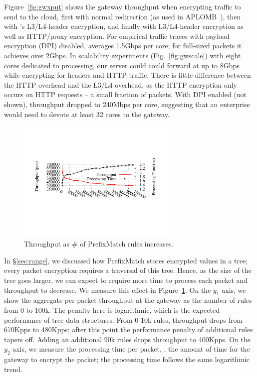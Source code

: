  
Figure~\ref{fig:gwxput} shows the gateway throughput when encrypting traffic to send to the cloud, first with normal redirection (as used in APLOMB~\cite{aplomb}), then with \sys's L3/L4-header encryption, and finally with L3/L4-header encryption as well as HTTP/proxy encryption. 
For empirical traffic traces with payload encryption (DPI) disabled, \sys averages 1.5Gbps per core; for full-sized packets it achieves over 2Gbps.
In scalability experiments (Fig.~\ref{fig:gwscale}) with eight cores dedicated to processing, our server could could forward at up to 8Gbps while encrypting for headers and HTTP traffic.
There is little difference between the HTTP overhead and the L3/L4 overhead, as the HTTP encryption only occurs on HTTP requests -- a small fraction of packets. 
With DPI enabled (not shown), throughput dropped to 240Mbps per core, suggesting that an enterprise would need to devote at least 32 cores to the gateway.

\begin{figure}[t]
  \vspace{-10pt}
  \centering
  \includegraphics[width=3in]{fig/xputrange}
  \caption[]{\label{fig:xputrange} Throughput as \# of PrefixMatch rules increases.}
\end{figure}

In \S\ref{sec:range}, we discussed how PrefixMatch stores encrypted values in a tree; every packet encryption requires a traversal of this tree.
Hence, as the size of the tree goes larger, we can expect to require more time to process each packet and throughput to decrease.
We measure this effect in Figure~\ref{fig:xputrange}. 
On the $y_1$ axis, we show the aggregate per packet throughput at the gateway as the number of rules from 0 to 100k. The penalty here is logarithmic, which is the expected performance of tree data structures. From 0-10k rules, throughput drops from 670Kpps to 480Kpps; after this point the performance penalty of additional rules tapers off. Adding an additional 90k rules drops throughput to 400Kpps.
On the $y_2$ axis, we measure the processing time per packet, \ie{}, the amount of time for the gateway to encrypt the packet; the processing time follows the same logarithmic trend.

